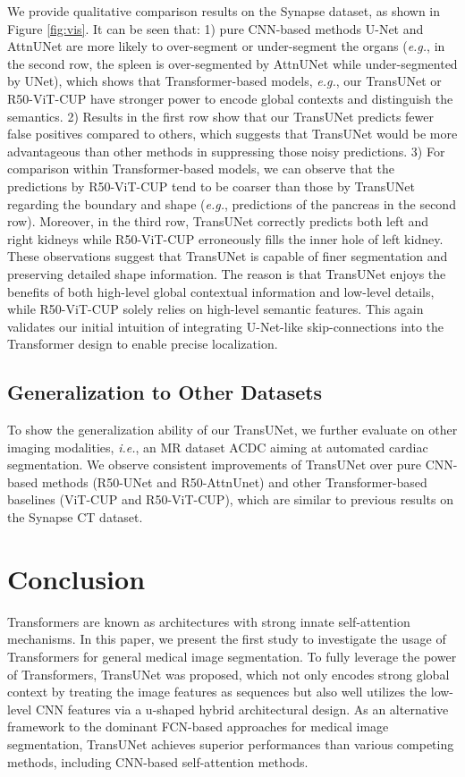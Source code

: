 \documentclass[runningheads]{llncs}
\begin{document}
We provide qualitative comparison results on the Synapse dataset, as shown in Figure \ref{fig:vis}. It can be seen that: 1) pure CNN-based methods U-Net and AttnUNet are more likely to over-segment or under-segment the organs (\emph{e.g.}, in the second row, the spleen is over-segmented by AttnUNet while under-segmented by UNet), which shows that Transformer-based models, \emph{e.g.}, our TransUNet or R50-ViT-CUP have stronger power to encode global contexts and distinguish the semantics. 2) Results in the first row show that our TransUNet predicts fewer false positives compared to others, which suggests that TransUNet would be more advantageous than other methods in suppressing those noisy predictions. 3) For comparison within Transformer-based models, we can observe that the predictions by R50-ViT-CUP tend to be coarser than those by TransUNet regarding the boundary and shape (\emph{e.g.}, predictions of the pancreas in the second row). Moreover, in the third row, TransUNet correctly predicts both left and right kidneys while R50-ViT-CUP erroneously fills the inner hole of left kidney. These observations suggest that TransUNet is capable of finer segmentation and preserving detailed shape information. 
The reason is that TransUNet enjoys the benefits of both high-level global contextual information and low-level details,
while R50-ViT-CUP solely relies on high-level semantic features. 
This again validates our initial intuition of integrating U-Net-like skip-connections into the Transformer design to enable precise localization.

\subsection{Generalization to Other Datasets}

To show the generalization ability of our TransUNet, we further evaluate on other imaging modalities, \emph{i.e.}, an MR dataset ACDC aiming at automated cardiac segmentation. We observe consistent improvements of TransUNet over pure CNN-based methods (R50-UNet and R50-AttnUnet) and other Transformer-based baselines (ViT-CUP and R50-ViT-CUP), which are similar to previous results on the Synapse CT dataset.

\section{Conclusion}
Transformers are known as architectures with strong innate self-attention mechanisms.
In this paper, we present the first study to investigate the usage of Transformers for general medical image segmentation. 
To fully leverage the power of Transformers, TransUNet was proposed, which not only encodes strong global context by treating the image features as sequences but also well utilizes the low-level CNN features via a u-shaped hybrid architectural design.
As an alternative framework to the dominant FCN-based approaches for medical image segmentation, TransUNet achieves superior performances than various competing methods, including CNN-based self-attention methods.
\end{document}
